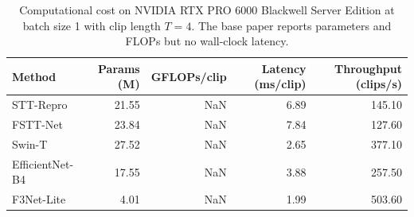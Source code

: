 \begin{table}[!t]
\centering
\caption{Computational cost on NVIDIA RTX PRO 6000 Blackwell Server Edition at batch size 1 with clip length $T=4$. The base paper reports parameters and FLOPs but no wall-clock latency.}
\label{tab:tableXI_efficiency}
\footnotesize
\begin{tabular}{lrrrr}
\hline\hline
Method & Params (M) & GFLOPs/clip & Latency (ms/clip) & Throughput (clips/s) \\
\hline
STT-Repro & 21.55 & NaN & 6.89 & 145.10 \\
FSTT-Net & 23.84 & NaN & 7.84 & 127.60 \\
Swin-T & 27.52 & NaN & 2.65 & 377.10 \\
EfficientNet-B4 & 17.55 & NaN & 3.88 & 257.50 \\
F3Net-Lite & 4.01 & NaN & 1.99 & 503.60 \\
\hline\hline
\end{tabular}
\end{table}
